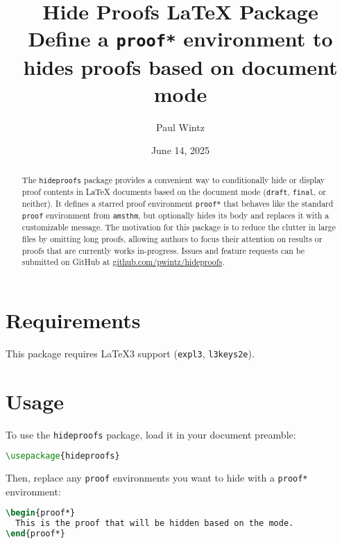 \documentclass{article}
\title{Hide Proofs \LaTeX{} Package \\
\large Define a \texttt{proof*} environment to hides proofs based on document mode}
\author{Paul Wintz}
\date{June 14, 2025}
\begin{document}
\maketitle

\begin{abstract}
The \texttt{hideproofs} package provides a convenient way to conditionally hide or display proof contents in LaTeX documents based on the document mode (\texttt{draft}, \texttt{final}, or neither). It defines a starred proof environment \verb|proof*| that behaves like the standard \verb|proof| environment from \texttt{amsthm}, but optionally hides its body and replaces it with a customizable message.
The motivation for this package is to reduce the clutter in large files by omitting long proofs, allowing authors to focus their attention on results or proofs that are currently works in-progress.
Issues and feature requests can be submitted on GitHub at \href{https://github.com/pwintz/hideproofs}{github.com/pwintz/hideproofs}.
\end{abstract}


\section{Requirements}
\label{sec:Requirements}
This package requires \LaTeX3 support (\texttt{expl3}, \texttt{l3keys2e}).

% 

\section{Usage}
\label{sec:Usage}
To use the \texttt{hideproofs} package, load it in your document preamble:
\begin{lstlisting}[language=TeX]
\usepackage{hideproofs}
\end{lstlisting}
Then, replace any \texttt{proof} environments you want to hide with a \texttt{proof*} environment:
\begin{lstlisting}[language=TeX]
\begin{proof*}
  This is the proof that will be hidden based on the mode.
\end{proof*}
\end{lstlisting}
\end{document}
